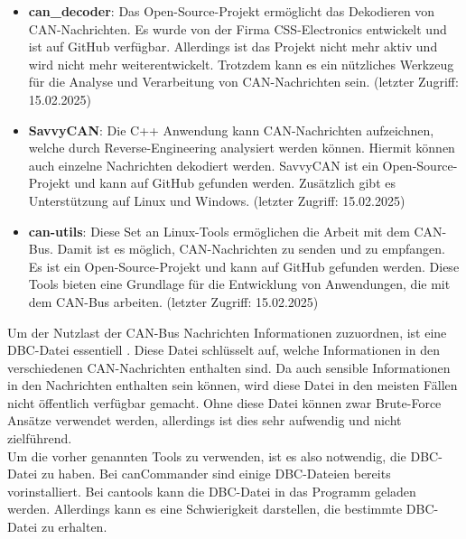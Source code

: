 \begin{itemize}
    \item \textbf{can\_decoder}: Das Open-Source-Projekt ermöglicht das Dekodieren von CAN-Nachrichten. Es wurde von der Firma
    CSS-Electronics entwickelt und ist auf GitHub verfügbar. Allerdings ist das Projekt nicht mehr aktiv und wird nicht mehr
    weiterentwickelt. Trotzdem kann es ein nützliches Werkzeug für die Analyse und Verarbeitung von CAN-Nachrichten sein. 
    \cite{can_decoder} (letzter Zugriff: 15.02.2025)
    \item \textbf{SavvyCAN}: Die C++ Anwendung kann CAN-Nachrichten aufzeichnen, welche durch Reverse-Engineering analysiert werden können.
    Hiermit können auch einzelne Nachrichten dekodiert werden. SavvyCAN ist ein Open-Source-Projekt und kann auf GitHub gefunden werden. Zusätzlich
    gibt es Unterstützung auf Linux und Windows. \cite{SavvyCAN} (letzter Zugriff: 15.02.2025)
    \item \textbf{can-utils}: Diese Set an Linux-Tools ermöglichen die Arbeit mit dem CAN-Bus. Damit ist es möglich, CAN-Nachrichten zu senden und zu empfangen.
    Es ist ein Open-Source-Projekt und kann auf GitHub gefunden werden. Diese Tools bieten eine Grundlage für die Entwicklung von Anwendungen, die mit dem CAN-Bus arbeiten.
    \cite{can-utils} (letzter Zugriff: 15.02.2025)
\end{itemize}
Um der Nutzlast der CAN-Bus Nachrichten Informationen zuzuordnen, ist eine DBC-Datei essentiell \cite{Choi2021}. 
Diese Datei schlüsselt auf, welche Informationen in den verschiedenen CAN-Nachrichten enthalten sind.
Da auch sensible Informationen in den Nachrichten enthalten sein können, wird diese Datei in den meisten 
Fällen nicht öffentlich verfügbar gemacht. Ohne diese Datei können zwar Brute-Force Ansätze verwendet werden,
allerdings ist dies sehr aufwendig und nicht zielführend. \\
Um die vorher genannten Tools zu verwenden, ist es also notwendig, die DBC-Datei zu haben. Bei canCommander
sind einige DBC-Dateien bereits vorinstalliert. Bei cantools kann die DBC-Datei in das Programm geladen werden.
Allerdings kann es eine Schwierigkeit darstellen, die bestimmte DBC-Datei zu erhalten.